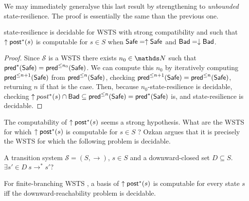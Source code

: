 We may immediately generalyse this last result by strengthening to \emph{unbounded} state-resilience. The proof is essentially the same than the previous one.

\begin{corollary}\label{postcomputable}
{\sc state-resilience} is decidable for WSTS with strong compatibility and such that $\uparrow \textsf{post}^*(s)$ is computable for $s \in S$
when
$\textsf{Safe}=\uparrow \textsf{Safe}$
and $\textsf{Bad}=\downarrow \textsf{Bad}$.
\end{corollary}

\begin{proof}
Since $\mathscr{S}$ is a WSTS there exists $n_0 \in \N$ such that
$\textsf{pred}^*(\textsf{Safe}) =  \textsf{pred}^{\leq n_0}(\textsf{Safe})$. We can compute this $n_0$ by iteratively computing 
$\textsf{pred}^{\leq n+1}(\textsf{Safe})$ from $\textsf{pred}^{\leq n}(\textsf{Safe})$, checking 
$\textsf{pred}^{\leq n+1}(\textsf{Safe}) = \textsf{pred}^{\leq n}(\textsf{Safe})$, 
returning $n$ if that is the case.
Then, because $n_0$-state-resilience is decidable, 
checking $\uparrow post^*(s) \cap \textsf{Bad} \subseteq \textsf{pred}^{\leq n}(\textsf{Safe}) = \textsf{pred}^*(\textsf{Safe})$ is,
and state-resilience is decidable.
\end{proof}

\iffalse
\alain{definir downward reachability problem.....
downward-closed problem given a state $s$ of a WSTS
with strong compatibility 
and a decidable downward-closed set $D$, it can be decided whether $\exists s' \in D ~ s \to^* s'$. }
\fi


The computability of $\uparrow \textsf{post}^*(s)$ seems a strong hypothesis. What are the WSTS for which $\uparrow \textsf{post}^*(s)$ is computable for $s \in S$ ?
Ozkan \cite{DBLP:conf/gg/Ozkan22} argues that it is precisely the WSTS for which the following problem is decidable.

{A transition system $\mathscr{S}=(S,\rightarrow)$, $s \in S$ and a downward-closed set $D
\subseteq S$.}
{$\exists s' \in D ~ s \to^* s'$? \newline}



\begin{proposition}\label{post*}
For finite-branching WSTS%
, a basis of $\uparrow \textsf{post}^*(s)$ is computable for every state $s$ iff the downward-reachability problem is decidable.
\end{proposition}


